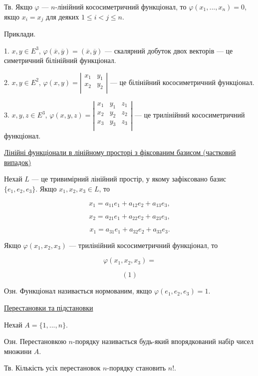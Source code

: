 Тв. Якщо $\varphi$ --- $n$-лінійний кососиметричний функціонал, то $\varphi(x_1, ..., x_n) = 0$,
якщо $x_i = x_j$ для деяких $1 \leqslant i < j \leqslant n$.


Приклади.

1. $x, y \in E^3$, $\varphi(\overline{x},\overline{y}) = (\overline{x},\overline{y})$ --- скалярний
добуток двох векторів --- це симетричний білінійний функціонал.

2. $x, y \in E^2$, $\varphi(x,y) = \left| \begin{matrix} x_1 & y_1 \\ x_2 & y_2 \\ \end{matrix} \right|$ ---
це білінійний кососиметричний функціонал.

3. $x, y, z \in E^3$,
$\varphi(x,y,z) = \left| \begin{matrix}
	x_1 & y_1 & z_1 \\
	x_2 & y_2 & z_2 \\
	x_3 & y_3 & z_3 \\
\end{matrix} \right|$
--- це трилінійний кососиметричний функціонал.


\underline{Лінійні функціонали в лінійному просторі з фіксованим базисом
(частковий випадок)}


Нехай $L$ --- це тривимірний лінійний простір, у якому зафіксовано базис
$\{e_1, e_2, e_3\}$. Якщо $x_1, x_2, x_3 \in L$, то

$$x_1 = a_{11} e_1 + a_{12} e_2 + a_{13} e_3,$$

$$x_2 = a_{21} e_1 + a_{22} e_2 + a_{23} e_3,$$

$$x_1 = a_{31} e_1 + a_{32} e_2 + a_{33} e_3.$$


Якщо $\varphi(x_1, x_2, x_3)$ --- трилінійний кососиметричний функціонал, то 

$$\varphi(x_1, x_2, x_3) = $$




$$(1)$$





Озн. Функціонал називається нормованим, якщо $\varphi(e_1, e_2, e_3) = 1$.

\underline{Перестановки та підстановки}

Нехай $A = \{1, ..., n\}$.

Озн. Перестановкою $n$-порядку називається будь-який впорядкований набір
чисел множини $A$.


Тв. Кількість усіх перестановок $n$-порядку становить $n!$.

